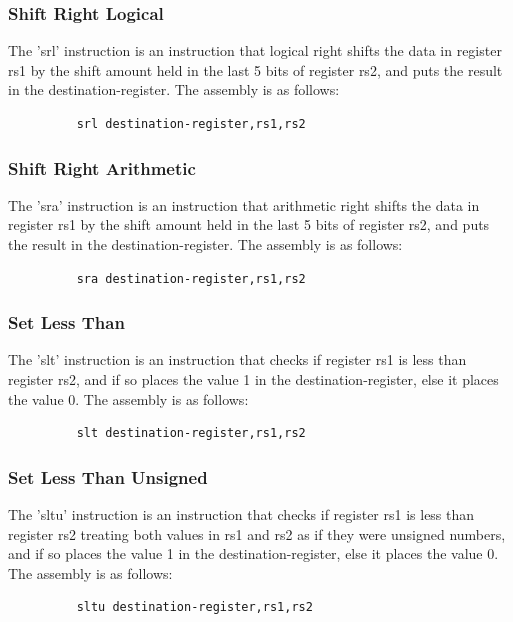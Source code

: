 \documentclass{article}
\begin{document}
\subsubsection{Shift Right Logical}
\qquad
The 'srl' instruction is an instruction that logical right shifts the data in register rs1 by the shift amount held in the last 5 bits of register rs2, and puts the result in the destination-register. The assembly is as follows:
\begin{figure}[!htbp]
    \centering
    \begin{verbatim}
    srl destination-register,rs1,rs2
    \end{verbatim}
\end{figure}\newline

\subsubsection{Shift Right Arithmetic}
\qquad
The 'sra' instruction is an instruction that arithmetic right shifts the data in register rs1 by the shift amount held in the last 5 bits of register rs2, and puts the result in the destination-register. The assembly is as follows:
\begin{figure}[!htbp]
    \centering
    \begin{verbatim}
    sra destination-register,rs1,rs2
    \end{verbatim}
\end{figure}\newline

\subsubsection{Set Less Than}
\qquad
The 'slt' instruction is an instruction that checks if register rs1 is less than register rs2, and if so places the value 1 in the destination-register, else it places the value 0. The assembly is as follows:
\begin{figure}[!htbp]
    \centering
    \begin{verbatim}
    slt destination-register,rs1,rs2
    \end{verbatim}
\end{figure}\newline

\subsubsection{Set Less Than Unsigned}
\qquad
The 'sltu' instruction is an instruction that checks if register rs1 is less than register rs2 treating both values in rs1 and rs2 as if they were unsigned numbers, and if so places the value 1 in the destination-register, else it places the value 0. The assembly is as follows:
\begin{figure}[!htbp]
    \centering
    \begin{verbatim}
    sltu destination-register,rs1,rs2
    \end{verbatim}
\end{figure}\newline
\end{document}

